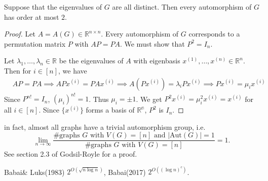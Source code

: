 \begin{theorem}
Suppose that the eigenvalues of $G$ are all distinct. Then every automorphism of $G$ has order at most $2$.
\end{theorem}

\begin{proof}
Let $A=A(G)\in\mathbb{R}^{n\times n}$. Every automorphism of $G$ corresponds to a permutation matrix $P$ with $AP=PA$. We must show that $P^2=I_n$.

Let $\lambda_1,\ldots,\lambda_n\in\mathbb{R}$ be the eigenvalues of $A$ with eigenbasis $x^{(1)},\ldots,x^{(n)}\in\mathbb{R}^n$. Then for $i\in[n]$, we have 
\begin{align*}
&AP=PA\implies APx^{(i)}=PAx^{(i)}\implies A(Px^{(i)})=\lambda_i Px^{(i)}
\implies  Px^{(i)}=\mu_i x^{(i)}
\end{align*}
Since $P^{n!}=I_n$, $(\mu_i)^{n!}=1$. Thus $\mu_i=\pm 1$. We get $P^2x^{(i)}=\mu_i^2x^{(i)}=x^{(i)}$ for all $i\in[n]$. Since $\{x^{(i)}\}$ forms a basis of $\mathbb{R^n}$, $P^2$ is $I_n$.
\end{proof}
\begin{remark}
in fact, almost all graphs have a trivial automorphism group, i.e.
\[\lim_{n\to\infty}\frac{\#\textrm{graphs $G$ with $V(G)=[n]$ and $\left|\mathrm{Aut}(G)\right|=1$}}{\#\textrm{graphs $G$ with $V(G)=[n]$}}=1.\]
See section 2.3 of Godsil-Royle for a proof.
\end{remark}
\begin{remark}
Babai\& Luks(1983)  $2^{O(\sqrt{n\log n})}$, Babai(2017)  $2^{O((\log n)^c)}$.
\end{remark}